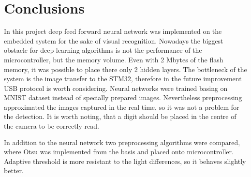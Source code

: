 \chapter{Conclusions}
\endgroup
In this project deep feed forward neural network was implemented on the embedded system for the sake of visual recognition. Nowadays the biggest obstacle for deep learning algorithms is not the performance of the microcontroller, but the memory volume. Even with 2 Mbytes of the flash memory, it was possible to place there only 2 hidden layers. The bottleneck of the system is the image transfer to the STM32, therefore in the future improvement USB protocol is worth considering. Neural networks were trained basing on MNIST dataset instead of specially prepared images. Nevertheless preprocessing approximated the images captured in the real time, so it was not a problem for the detection. It is worth noting, that a digit should be placed in the centre of the camera to be correctly read.

In addition to the neural network two preprocessing algorithms were compared, where Otsu was implemented from the basis and placed onto microcontroller. Adaptive threshold is more resistant to the light differences, so it behaves slightly better. 

